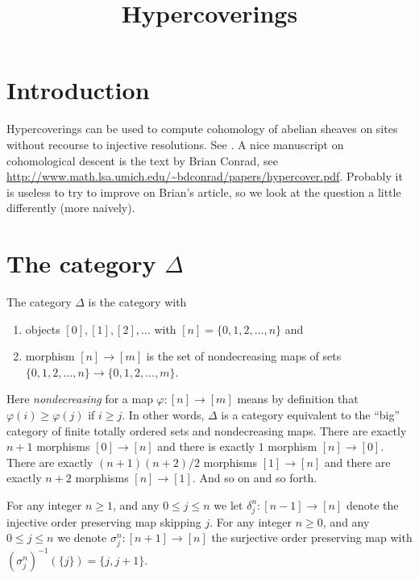 

%


\title{Hypercoverings}


\maketitle

\tableofcontents

\section{Introduction}
\label{section-introduction}

\noindent
Hypercoverings can be used to compute cohomology of abelian sheaves on sites
without recourse to injective resolutions. See \cite[Expose V, Sec. 7]{SGA4}.
A nice manuscript on cohomological descent is the text by Brian Conrad,
see \url{http://www.math.lsa.umich.edu/~bdconrad/papers/hypercover.pdf}.
Probably it is useless to try to improve on Brian's article, so we look
at the question a little differently (more naively).

\section{The category $\Delta$}
\label{section-Delta}

\noindent
The category $\Delta$ is the category with
\begin{enumerate}
\item objects $[0], [1], [2], \ldots$ with
$[n] = \{0, 1, 2, \ldots, n\}$ and
\item morphism $[n] \to [m]$ is the set of nondecreasing
maps of sets $\{0, 1, 2, \ldots, n\} \to \{0, 1, 2, \ldots, m\}$.
\end{enumerate}
Here {\it nondecreasing} for a map $\varphi : [n] \to [m]$
means by definition that $\varphi(i) \geq \varphi(j)$ if $i \geq j$.
In other words, $\Delta$ is a category equivalent to the
``big'' category of finite totally ordered sets and nondecreasing maps.
There are exactly $n + 1$ morphisms $[0] \to [n]$ and
there is exactly $1$ morphism $[n] \to [0]$. There are
exactly $(n + 1)(n + 2)/2$ morphisms $[1] \to [n]$ and there are
exactly $n + 2$ morphisms $[n] \to [1]$. And so on and so forth.

\begin{definition}
\label{definition-face-degeneracy}
For any integer $n\geq 1$, and any $0\leq j \leq n$ we let $\delta^n_j : [n-1]
\to [n]$ denote the injective order preserving map skipping $j$. For any
integer $n\geq 0$, and any $0\leq j \leq n$ we denote $\sigma^n_j : [n+1] 
\to [n]$ the surjective order preserving map with 
$(\sigma^n_j)^{-1}(\{j\}) = \{j, j+1\}$.
\end{definition}

